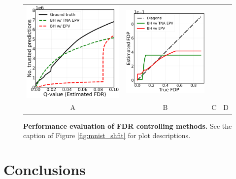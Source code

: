 \documentclass{article}
\begin{document}
\begin{figure}[h!]
\begin{tabular}{cccc}
		\includegraphics[width=2in]{img/cnn_multi_sa_bcss_fdr_control_loc.png}  &
		\includegraphics[width=1.7in]{img/cnn_FDPscat_sa_bcss.png}\\	
		A & B & C & D
	\end{tabular}
	\caption{{\bf Performance evaluation of FDR controlling methods.}  See the caption of Figure \ref{fig:mnist_shfit} for plot descriptions.}
	\label{fig:ii}
\end{figure} 


\section{Conclusions}
\end{document}
